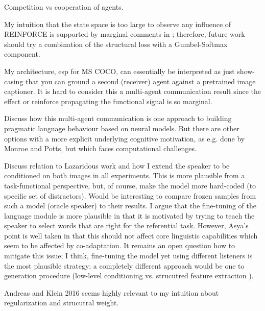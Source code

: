 
Competition vs cooperation of agents. 

My intuition that the state space is too large to observe any influence of REINFORCE is supported by marginal comments in \cite{havrylov2017emergence}; therefore, future work should try a combination of the structural loss with a Gumbel-Softmax component.

My architecture, esp for MS COCO, can essentially be interpreted as just show-casing that you can ground a second (receiver) agent against a pretrained image captioner. It is hard to consider this a multi-agent communication result since the effect or reinforce propagating the functional signal is so marginal. 

Discuss how this multi-agent communication is one approach to building pragmatic language behaviour based on neural models. But there are other options with a more explicit underlying cognitive motivation, as e.g. done by Monroe and Potts, but which faces computational challenges. 

Discuss relation to Lazaridous work and how I extend the speaker to be conditioned on both images in all experiments. This is more plausible from a task-functional perspective, but, of course, make the model more hard-coded (to specific set of distractors). Would be interesting to compare frozen samples from such a model (oracle speaker) to their results. I argue that the fine-tuning of the language module is more plausible in that it is motivated by trying to teach the speaker to select words that are right for the referential task. However, Asya's point is well taken in that this should not affect core linguistic capabilities which seem to be affected by co-adaptation. It remains an open question how to mitigate this issue; I think, fine-tuning the model yet using different listeners is the most plausible strategy; a completely different approach would be one to generation procedure (low-level conditioning vs. strucutred feature extraction ). 

Andreas and Klein 2016 seems highly relevant to my intuition about regularization and strucutral weight. 